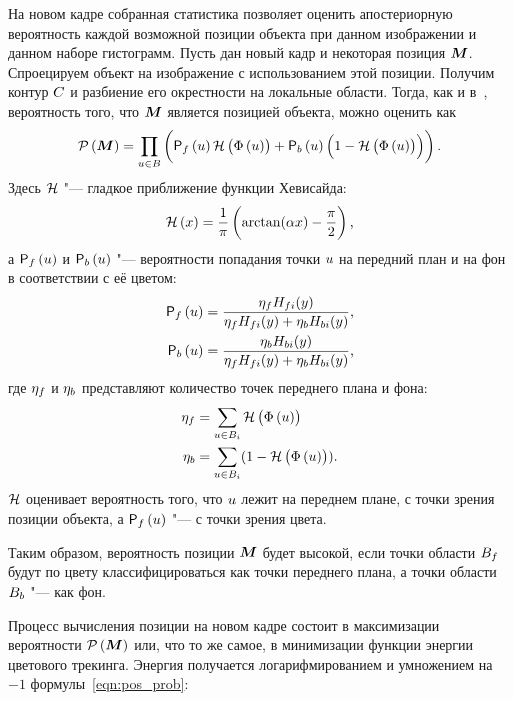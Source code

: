 На новом кадре собранная статистика позволяет оценить апостериорную вероятность
каждой возможной позиции объекта при данном изображении и данном наборе
гистограмм.
Пусть дан новый кадр и некоторая позиция $\bm{M}$.
Спроецируем объект на изображение с использованием этой позиции.
Получим контур $C$ и разбиение его окрестности на локальные области.
Тогда, как и в~\cite{Hexner2016}, вероятность того, что $\bm{M}$ является
позицией объекта, можно оценить как
\begin{equation}\label{eqn:pos_prob}
    \mathcal{P} \left( \bm{M} \right)  = \prod\limits_{\mathnormal{u} \in B} \left(
        \mathsf{P}_f \left( \mathnormal{u} \right) \mathcal{H} \left( \Phi \left( \mathnormal{u} \right) \right)
        + \mathsf{P}_b \left( \mathnormal{u} \right) \left( 1 - \mathcal{H} \left( \Phi \left( \mathnormal{u} \right) \right) \right)
    \right)
\text{.}
\end{equation}
Здесь $\mathcal{H}$ "--- гладкое приближение функции Хевисайда:
\begin{equation}\label{eqn:heaviside}
    \mathcal{H} \left( x \right) = \frac{1}{\pi} \left( \arctan(\alpha x) - \frac{\pi}{2} \right)
\text{,}
\end{equation}
а $\mathsf{P}_f \left( \mathnormal{u} \right)$ и $\mathsf{P}_b \left( \mathnormal{u} \right)$ "--- вероятности попадания точки $\mathnormal{u}$ на
передний план и на фон в соответствии с её цветом:
\begin{align}\label{eqn:Pfu}
    \mathsf{P}_f \left( \mathnormal{u} \right) &= \frac{\eta_f H_{fi}(y)}{\eta_f H_{fi}(y) +
        \eta_b H_{bi}(y)} \text{,} \\
    \mathsf{P}_b \left( \mathnormal{u} \right) &= \frac{\eta_b H_{bi}(y)}{\eta_f H_{fi}(y) +
        \eta_b H_{bi}(y)} \text{,}
\end{align}
где $\eta_f$ и $\eta_b$ представляют количество точек переднего плана и фона:
\begin{align}
    \eta_f &= \sum\limits_{\mathnormal{u} \in B_{i}}\mathcal{H} \left( \Phi \left( \mathnormal{u} \right) \right) \\
    \eta_b &= \sum\limits_{\mathnormal{u} \in B_{i}}(1 - \mathcal{H} \left( \Phi \left( \mathnormal{u} \right) \right))
\text{.}
\end{align}
$\mathcal{H}$ оценивает вероятность того, что $\mathnormal{u}$ лежит на переднем плане, с точки
зрения позиции объекта, а $\mathsf{P}_f \left( \mathnormal{u} \right)$ "--- с точки зрения цвета.

Таким образом, вероятность позиции $\bm{M}$ будет высокой, если точки области
$B_{f}$ будут по цвету классифицироваться как точки переднего плана, а
точки области $B_{b}$ "--- как фон.

Процесс вычисления позиции на новом кадре состоит в максимизации вероятности
$\mathcal{P} \left( \bm{M} \right) $ или, что то же самое, в минимизации функции энергии
цветового трекинга.
Энергия получается логарифмированием и умножением на $-1$
формулы~\ref{eqn:pos_prob}:

